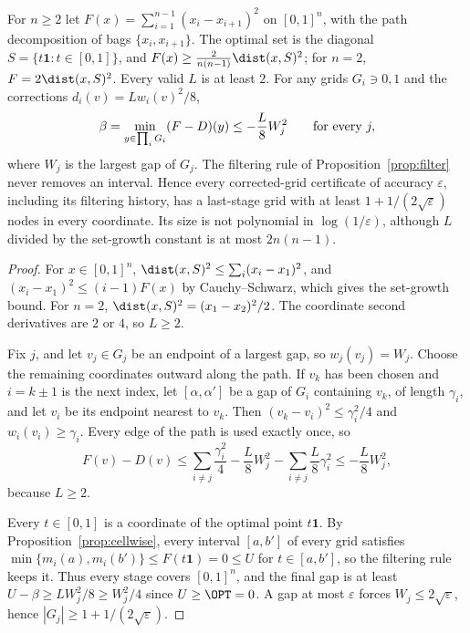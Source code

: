 \begin{proposition}\label{lim:prop:setgrowth}
For $n\ge2$ let $F(x)=\sum_{i=1}^{n-1}(x_i-x_{i+1})^2$ on $[0,1]^n$, with
the path decomposition of bags $\{x_i,x_{i+1}\}$. The optimal set is the
diagonal $S=\{t\mathbf1:t\in[0,1]\}$, and
$F(x)\ge\frac2{n(n-1)}\dist(x,S)^2$; for $n=2$, $F=2\dist(x,S)^2$. Every
valid $L$ is at least $2$. For any grids $G_i\ni0,1$ and the corrections
$d_i(v)=Lw_i(v)^2/8$,
\[
\beta=\min_{y\in\prod_iG_i}(F-D)(y)\le-\frac L8W_j^2
\qquad\hbox{for every }j,
\]
where $W_j$ is the largest gap of $G_j$. The filtering rule of
Proposition~\ref{prop:filter} never removes an interval. Hence every
corrected-grid certificate of accuracy $\varepsilon$, including its
filtering history, has a last-stage grid with at least
$1+1/(2\sqrt\varepsilon)$ nodes in every coordinate. Its size is not
polynomial in $\log(1/\varepsilon)$, although $L$ divided by the set-growth
constant is at most $2n(n-1)$.
\end{proposition}

\begin{proof}
For $x\in[0,1]^n$, $\dist(x,S)^2\le\sum_i(x_i-x_1)^2$, and
$(x_i-x_1)^2\le(i-1)F(x)$ by Cauchy--Schwarz, which gives the set-growth
bound. For $n=2$, $\dist(x,S)^2=(x_1-x_2)^2/2$. The coordinate second
derivatives are $2$ or $4$, so $L\ge2$.

Fix $j$, and let $v_j\in G_j$ be an endpoint of a largest gap, so
$w_j(v_j)=W_j$. Choose the remaining coordinates outward along the path. If
$v_k$ has been chosen and $i=k\pm1$ is the next index, let $[\alpha,\alpha']$
be a gap of $G_i$ containing $v_k$, of length $\gamma_i$, and let $v_i$ be
its endpoint nearest to $v_k$. Then $(v_k-v_i)^2\le\gamma_i^2/4$ and
$w_i(v_i)\ge\gamma_i$. Every edge of the path is used exactly once, so
\[
F(v)-D(v)\le\sum_{i\ne j}\frac{\gamma_i^2}4-\frac L8W_j^2
-\sum_{i\ne j}\frac L8\gamma_i^2\le-\frac L8W_j^2,
\]
because $L\ge2$.

Every $t\in[0,1]$ is a coordinate of the optimal point $t\mathbf1$. By
Proposition~\ref{prop:cellwise}, every interval $[a,b']$ of every grid satisfies
$\min\{m_i(a),m_i(b')\}\le F(t\mathbf1)=0\le U$ for $t\in[a,b']$, so the
filtering rule keeps it. Thus every stage covers $[0,1]^n$, and the final
gap is at least $U-\beta\ge LW_j^2/8\ge W_j^2/4$ since $U\ge\OPT=0$. A gap
at most $\varepsilon$ forces $W_j\le2\sqrt\varepsilon$, hence
$|G_j|\ge1+1/(2\sqrt\varepsilon)$.
\end{proof}

